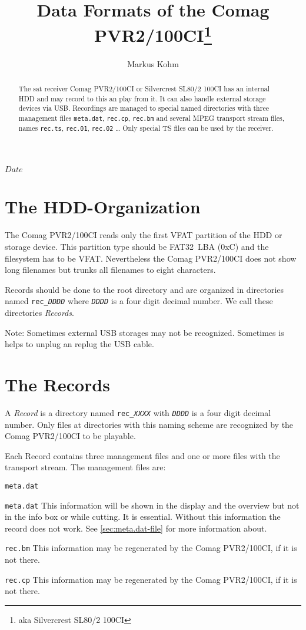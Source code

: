 \documentclass{scrartcl}
\newcommand*{\Comag}{Comag PVR2/100CI\xspace}
\begin{document}
\title{Data Formats of the Comag PVR2/100CI\footnote{aka Silvercrest SL80/2
    100CI}}
\author{Markus Kohm}
\SVNdate $Date$
\maketitle
\begin{abstract}
  The sat receiver Comag PVR2/100CI or Silvercrest SL80/2 100CI has an
  internal HDD and may record to this an play from it. It can also handle
  external storage devices via USB. Recordings are managed to special named
  directories with three management files \texttt{meta.dat}, \texttt{rec.cp},
  \texttt{rec.bm} and several MPEG transport stream files, names
  \texttt{rec.ts}, \texttt{rec.01}, \texttt{rec.02} \dots
  Only special TS files can be used by the receiver.
\end{abstract}

\tableofcontents

\section{The HDD-Organization}
\label{sec:hdd-organization}

The \Comag reads only the first VFAT partition of the HDD or storage
device. This partition type should be FAT32~LBA (0xC) and the filesystem has
to be VFAT. Nevertheless the \Comag does not show long filenames but trunks
all filenames to eight characters.

Records should be done to the root directory and are organized in directories
named \texttt{rec\_\textit{DDDD}} where \texttt{\textit{DDDD}} is a four digit
decimal number. We call these directories \emph{Records}.

Note: Sometimes external USB storages may not be recognized. Sometimes is
helps to unplug an replug the USB cable.

\section{The Records}
\label{sec:records}

A \emph{Record} is a directory named \texttt{rec\_\textit{XXXX}} with
\texttt{\textit{DDDD}} is a four digit decimal number. Only files at
directories with this naming scheme are recognized by the \Comag to be
playable.

Each Record contains three management files and one or more files with the
transport stream. The management files are:
\begin{labeling}[:]{\texttt{meta.dat}}
\item [\texttt{meta.dat}] This information will be shown in the display and
  the overview but not in the info box or while cutting. It is
  essential. Without this information the record does not work. See
  \ref{sec:meta.dat-file} for more information about.
\item [\texttt{rec.bm}] This information may be regenerated by the \Comag, if
  it is not there.
\item [\texttt{rec.cp}] This information may be regenerated by the \Comag, if
  it is not there.
\end{labeling}
\end{document}
